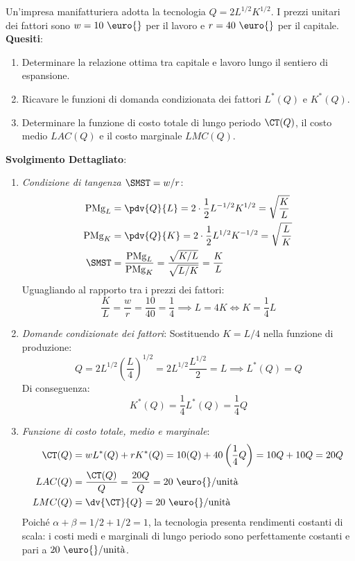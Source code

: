 \begin{esercizio}
Un'impresa manifatturiera adotta la tecnologia $Q = 2 L^{1/2} K^{1/2}$. I prezzi unitari dei fattori sono $w = 10\text{ \euro{}}$ per il lavoro e $r = 40\text{ \euro{}}$ per il capitale.
\textbf{Quesiti}:
\begin{enumerate}
    \item Determinare la relazione ottima tra capitale e lavoro lungo il sentiero di espansione.
    \item Ricavare le funzioni di domanda condizionata dei fattori $L^*(Q)$ e $K^*(Q)$.
    \item Determinare la funzione di costo totale di lungo periodo $\CT(Q)$, il costo medio $LAC(Q)$ e il costo marginale $LMC(Q)$.
\end{enumerate}

\tcbline
\textbf{Svolgimento Dettagliato}:
\begin{enumerate}
    \item \textit{Condizione di tangenza $\SMST = w/r$}:
    \begin{align*}
        \mathrm{PMg}_L &= \pdv{Q}{L} = 2 \cdot \frac{1}{2} L^{-1/2} K^{1/2} = \sqrt{\frac{K}{L}} \\
        \mathrm{PMg}_K &= \pdv{Q}{K} = 2 \cdot \frac{1}{2} L^{1/2} K^{-1/2} = \sqrt{\frac{L}{K}} \\
        \SMST &= \frac{\mathrm{PMg}_L}{\mathrm{PMg}_K} = \frac{\sqrt{K/L}}{\sqrt{L/K}} = \frac{K}{L}
    \end{align*}
    Uguagliando al rapporto tra i prezzi dei fattori:
    \begin{equation*}
        \frac{K}{L} = \frac{w}{r} = \frac{10}{40} = \frac{1}{4} \implies L = 4K \iff K = \frac{1}{4} L
    \end{equation*}
    
    \item \textit{Domande condizionate dei fattori}:
    Sostituendo $K = L/4$ nella funzione di produzione:
    \begin{equation*}
        Q = 2 L^{1/2} \left(\frac{L}{4}\right)^{1/2} = 2 L^{1/2} \frac{L^{1/2}}{2} = L \implies L^*(Q) = Q
    \end{equation*}
    Di conseguenza:
    \begin{equation*}
        K^*(Q) = \frac{1}{4} L^*(Q) = \frac{1}{4} Q
    \end{equation*}
    
    \item \textit{Funzione di costo totale, medio e marginale}:
    \begin{align*}
        \CT(Q) &= w L^*(Q) + r K^*(Q) = 10(Q) + 40\left(\frac{1}{4} Q\right) = 10Q + 10Q = 20Q \\
        LAC(Q) &= \frac{\CT(Q)}{Q} = \frac{20Q}{Q} = 20\text{ \euro{}/unità} \\
        LMC(Q) &= \dv{\CT}{Q} = 20\text{ \euro{}/unità}
    \end{align*}
    Poiché $\alpha + \beta = 1/2 + 1/2 = 1$, la tecnologia presenta rendimenti costanti di scala: i costi medi e marginali di lungo periodo sono perfettamente costanti e pari a $20\text{ \euro{}/unità}$.
\end{enumerate}
\end{esercizio}
